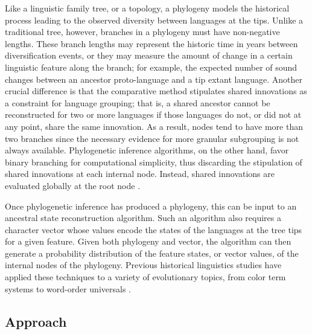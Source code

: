 \documentclass[12pt,a4paper]{article}
\newcounter{example}
\begin{document}
Like a linguistic family tree, or a topology, a phylogeny models the historical process leading to the observed diversity between languages at the tips. Unlike a traditional tree, however, branches in a phylogeny must have non-negative lengths. These branch lengths may represent the historic time in years between diversification events, or they may measure the amount of change in a certain linguistic feature along the branch; for example, the expected number of sound changes between an ancestor proto-language and a tip extant language. Another crucial difference is that the comparative method stipulates shared innovations as a constraint for language grouping; that is, a shared ancestor cannot be reconstructed for two or more languages if those languages do not, or did not at any point, share the same innovation. As a result, nodes tend to have more than two branches since the necessary evidence for more granular subgrouping is not always available. Phylogenetic  inference algorithms, on the other hand, favor binary branching for computational simplicity, thus discarding the stipulation of shared innovations at each internal node. Instead, shared innovations are evaluated globally at the root node \parencite{jager_computational_2019}.

Once phylogenetic inference has produced a phylogeny, this can be input to an ancestral state reconstruction algorithm. Such an algorithm also requires a character vector whose values encode the states of the languages at the tree tips for a given feature. Given both phylogeny and vector, the algorithm can then generate a probability distribution of the feature states, or vector values, of the internal nodes of the phylogeny. Previous historical linguistics studies have applied these techniques to a variety of evolutionary topics, from color term systems \parencite{haynie_phylogenetic_2016} to word-order universals \parencite{dunn_evolved_2011}.

\subsection{Approach}
\end{document}
